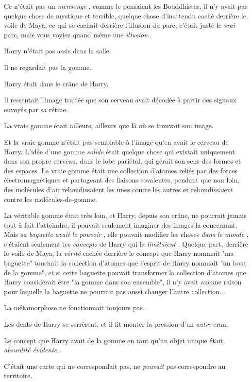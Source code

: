Ce n'était pas un \emph{mensonge} , comme le pensaient les Bouddhistes, il n'y avait pas quelque chose de mystique et terrible, quelque chose d'inattendu caché derrière le voile de Maya, ce qui se cachait derrière l'illusion du parc, c'était juste le \emph{vrai}  parc, mais vous voyiez quand même une \emph{illusion} .

Harry n'était pas assis dans la salle.

Il ne regardait pas la gomme.

Harry était dans le crâne de Harry.

Il ressentait l'image traitée que son cerveau avait décodée à partir des signaux envoyés par sa rétine.

La vraie gomme était ailleurs, ailleurs que là où se trouvait son image.

Et la vraie gomme n'était pas semblable à l'image qu'en avait le cerveau de Harry. L'idée d'une gomme \emph{solide}  était quelque chose qui existait uniquement dans son propre cerveau, dans le lobe pariétal, qui gérait son sens des formes et des espaces. La vraie gomme était une collection d'atomes reliés par des forces électromagnétiques et partageant des liaisons covalentes, pendant que non loin, des molécules d'air rebondissaient les unes contre les autres et rebondissaient contre les molécules-de-gomme.

La véritable gomme était très loin, et Harry, depuis son crâne, ne pourrait jamais tout à fait l'atteindre, il pouvait seulement imaginer des images la concernant. Mais \emph{sa baguette avait le pouvoir} , elle pouvait modifier les choses \emph{dans le monde} , c'étaient seulement les \emph{concepts}  de Harry qui la \emph{limitaient} . Quelque part, derrière le voile de Maya, la \emph{vérité}  cachée derrière le concept que Harry nommait "ma baguette" touchait la collection d'atomes que l'esprit de Harry nommait "un bout de la gomme", et si cette baguette pouvait transformer la collection d'atomes que Harry considérait être "la gomme dans son ensemble", il n'y avait aucune raison pour laquelle la baguette ne pourrait pas aussi changer l'autre collection...

La métamorphose ne fonctionnait toujours pas.

Les dents de Harry se serrèrent, et il fit monter la pression d'un \emph{autre}  cran.

Le concept que Harry avait de la gomme en tant qu'un objet unique était \emph{absurdité évidente} .

C'était une carte qui ne correspondait pas, ne \emph{pouvait pas}  correspondre au territoire.

